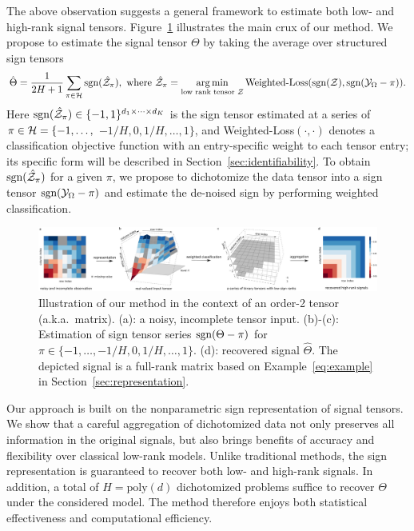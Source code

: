 \documentclass[twoside,11pt]{article}
\theoremstyle{plain}
\theoremstyle{definition}
\def\sign{\textup{sgn}}
\begin{document}
The above observation suggests a general framework to estimate both low- and high-rank signal tensors. Figure~\ref{fig:demo} illustrates the main crux of our method. We propose to estimate the signal tensor $\Theta$ by taking the average over structured sign tensors
\begin{equation}\label{eq:intuition}
\hat \Theta = {1\over 2H+1}\sum_{\pi \in \tH} \sign(\hat \tZ_\pi), \ \text{where}\ \hat \tZ_\pi=\argmin_{\text{low rank tensor $\tZ$}} \text{Weighted-Loss}(\sign(\tZ), \sign (\tY_\Omega-\pi)).
\end{equation}
Here $\sign(\hat \tZ_\pi)\in\{-1,1\}^{d_1\times\cdots\times d_K}$ is the sign tensor estimated at a series of $\pi\in \mathcal{H}=\{\small-1,\ldots,$ $-{1/H},0, {1/H},\ldots,1\}$, and Weighted-Loss$(\cdot,\cdot)$ denotes a classification objective function with an entry-specific weight to each tensor entry; its specific form will be described in Section~\ref{sec:identifiability}. To obtain $\sign(\hat \tZ_\pi)$ for a given $\pi$, we propose to dichotomize the data tensor into a sign tensor $\sign (\tY_\Omega-\pi)$ and estimate the de-noised sign by performing weighted classification. 

\begin{figure}[h!]
\centerline{\includegraphics[width=\textwidth]{figure/demo.pdf}}
\caption{Illustration of our method in the context of an order-2 tensor (a.k.a.\ matrix). (a): a noisy, incomplete tensor input. (b)-(c): Estimation of sign tensor series $\sign(\Theta-\pi)$ for $\pi\in  \{-1,\ldots,-{1/ H},0,{1/H},\ldots,1\}$. (d): recovered signal $\hat \Theta$. The depicted signal is a full-rank matrix based on Example~\ref{eq:example} in Section~\ref{sec:representation}.}\label{fig:demo}
\end{figure}

Our approach is built on the nonparametric sign representation of signal tensors. We show that a careful aggregation of dichotomized data not only preserves all information in the original signals, but also brings benefits of accuracy and flexibility over classical low-rank models. Unlike traditional methods, the sign representation is guaranteed to recover both low- and high-rank signals. In addition, a total of $H=\text{poly}(d)$ dichotomized problems suffice to recover $\Theta$ under the considered model.  The method therefore enjoys both statistical effectiveness and computational efficiency. 
\end{document}
